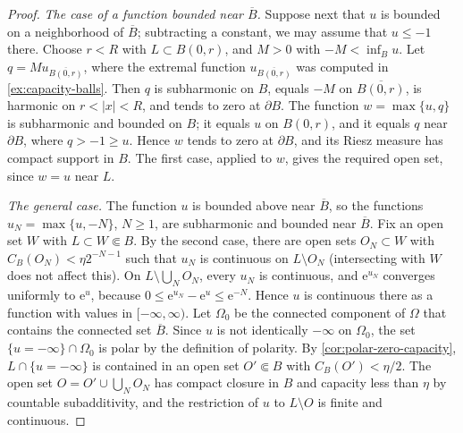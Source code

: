 \begin{proof}
\emph{The case of a function bounded near $\overline B$.} Suppose next that $u$ is bounded on a neighborhood of $\overline B$; subtracting a constant, we may assume that $u\leq-1$ there. Choose $r<R$ with $L\subset B(0,r)$, and $M>0$ with $-M<\inf_Bu$. Let $q=Mu_{\overline{B(0,r)}}$, where the extremal function $u_{\overline{B(0,r)}}$ was computed in \cref{ex:capacity-balls}. Then $q$ is subharmonic on $B$, equals $-M$ on $\overline{B(0,r)}$, is harmonic on $r<|x|<R$, and tends to zero at $\partial B$. The function $w=\max\{u,q\}$ is subharmonic and bounded on $B$; it equals $u$ on $B(0,r)$, and it equals $q$ near $\partial B$, where $q>-1\geq u$. Hence $w$ tends to zero at $\partial B$, and its Riesz measure has compact support in $B$. The first case, applied to $w$, gives the required open set, since $w=u$ near $L$.

\emph{The general case.} The function $u$ is bounded above near $\overline B$, so the functions $u_N=\max\{u,-N\}$, $N\geq1$, are subharmonic and bounded near $\overline B$. Fix an open set $W$ with $L\subset W\Subset B$. By the second case, there are open sets $O_N\subset W$ with $C_B(O_N)<\eta2^{-N-1}$ such that $u_N$ is continuous on $L\setminus O_N$ (intersecting with $W$ does not affect this). On $L\setminus\bigcup_NO_N$, every $u_N$ is continuous, and $\mathrm e^{u_N}$ converges uniformly to $\mathrm e^u$, because $0\leq\mathrm e^{u_N}-\mathrm e^u\leq\mathrm e^{-N}$. Hence $u$ is continuous there as a function with values in $[-\infty,\infty)$. Let $\Omega_0$ be the connected component of $\Omega$ that contains the connected set $\overline B$. Since $u$ is not identically $-\infty$ on $\Omega_0$, the set $\{u=-\infty\}\cap\Omega_0$ is polar by the definition of polarity. By \cref{cor:polar-zero-capacity}, $L\cap\{u=-\infty\}$ is contained in an open set $O'\Subset B$ with $C_B(O')<\eta/2$. The open set $O=O'\cup\bigcup_NO_N$ has compact closure in $B$ and capacity less than $\eta$ by countable subadditivity, and the restriction of $u$ to $L\setminus O$ is finite and continuous.
\end{proof}
